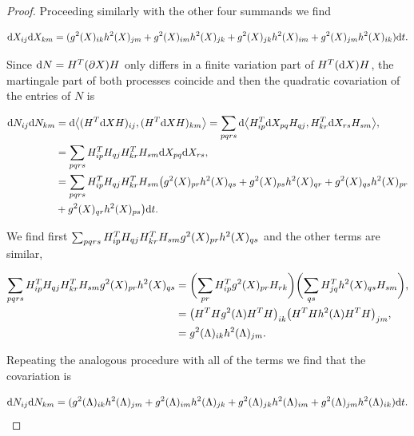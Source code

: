 \begin{proof}
    Proceeding similarly with the other four summands we find

    \begin{align*}
        \mathrm d X_{ij} \mathrm d X_{km} = (g^2(X)_{ik}h^2(X)_{jm} + g^2(X)_{im}h^2(X)_{jk} + g^2(X)_{jk}h^2(X)_{im} + g^2(X)_{jm}h^2(X)_{ik})\mathrm d t.
    \end{align*}

    Since $\mathrm d N = H^T(\partial X)H$ only differs in a finite variation part of $H^T(\mathrm d X) H$, the martingale part of both processes coincide and then the quadratic covariation of the entries of $N$ is

    \begin{align*}
        \mathrm d N_{ij}\mathrm d N_{km} &= \mathrm d \bigl< (H^T\mathrm d X H)_{ij},(H^T \mathrm d X H)_{km} \bigr> = \sum_{pqrs} \mathrm d\bigl< H^T_{ip}\mathrm d X_{pq} H_{qj}, H^T_{kr}\mathrm d X_{rs} H_{sm} \bigr>, \\
        &= \sum_{pqrs} H^T_{ip}H_{qj}H^T_{kr}H_{sm}\mathrm d X_{pq} \mathrm d X_{rs},\\ 
        &= \sum_{pqrs} H^T_{ip}H_{qj}H^T_{kr}H_{sm}\bigl(g^2(X)_{pr}h^2(X)_{qs} + g^2(X)_{ps}h^2(X)_{qr} + g^2(X)_{qs}h^2(X)_{pr} \\ 
        &+ g^2(X)_{qr}h^2(X)_{ps}\bigr)\mathrm d t.
    \end{align*}

    We find first $\sum_{pqrs} H^T_{ip}H_{qj}H^T_{kr}H_{sm}g^2(X)_{pr}h^2(X)_{qs}$ and the other terms are similar,

    \begin{align*}
        \sum_{pqrs} H^T_{ip}H_{qj}H^T_{kr}H_{sm}g^2(X)_{pr}h^2(X)_{qs} &= \biggl(\sum_{pr}H^T_{ip}g^2(X)_{pr}H_{rk}\biggr)\biggl(\sum_{qs}H^T_{jq}h^2(X)_{qs}H_{sm}\biggr),\\
        &= \bigl( H^THg^2(\Lambda)H^TH\bigr)_{ik}\bigl(H^THh^2(\Lambda)H^TH\bigr)_{jm},\\ 
        &= g^2(\Lambda)_{ik}h^2(\Lambda)_{jm}.
    \end{align*}

    Repeating the analogous procedure with all of the terms we find that the covariation is

    \begin{equation*} \label{eq:quadvarN}
        \mathrm d N_{ij}\mathrm d N_{km} = (g^2(\Lambda)_{ik}h^2(\Lambda)_{jm} + g^2(\Lambda)_{im}h^2(\Lambda)_{jk} + g^2(\Lambda)_{jk}h^2(\Lambda)_{im} + g^2(\Lambda)_{jm}h^2(\Lambda)_{ik})\mathrm d t.
    \end{equation*}


\end{proof}
